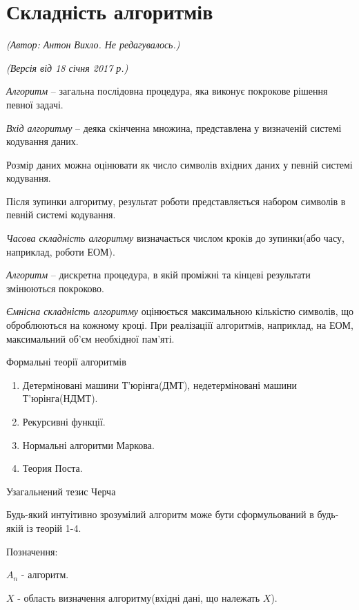 \section{Складність алгоритмів}
\begin{flushright}
\emph{(Автор: Антон Вихло. Не редагувалось.)}
\par \emph{(Версія від 18 січня 2017 р.)}
\end{flushright}

\emph{Алгоритм} -- загальна послідовна процедура, яка виконує покрокове рішення певної задачі.

\emph{Вхід алгоритму} -- деяка скінченна множина, представлена у визначеній системі кодування даних.

Розмір даних можна оцінювати як число символів вхідних даних у певній системі кодування.

Після зупинки алгоритму, результат роботи представляється набором символів в певній системі кодування.

\emph{Часова складність алгоритму} визначається числом кроків до зупинки(або часу, наприклад, роботи ЕОМ).

\emph{Алгоритм} -- дискретна процедура, в якій проміжні та кінцеві результати змінюються покроково.

\emph{Ємнісна складність алгоритму} оцінюється максимальною кількістю символів, що оброблюються на кожному кроці. При реалізаціїї алгоритмів, наприклад, на ЕОМ, максимальний об'єм необхідної пам'яті.
\begin{center} Формальні теорії алгоритмів \end{center}
\begin{enumerate} 
\item Детерміновані машини Т'юрінга(ДМТ), недетерміновані машини Т'юрінга(НДМТ).
\item Рекурсивні функції.
\item Нормальні алгоритми Маркова.
\item Теория Поста.
\end{enumerate} 

\begin{center} Узагальнений тезис Черча \end{center}


Будь-який интуітивно зрозумілий алгоритм може бути сформульований в будь-якій із теорій 1-4.

Позначення:

 $A_n$ - алгоритм.

$X$ - область визначення алгоритму(вхідні дані, що належать $X$).

